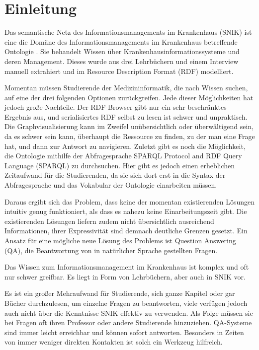 \documentclass[utf8,biblatex]{lni}
\begin{document}
%

\section{Einleitung}

Das semantische Netz des Informationsmanagements im Krankenhaus (SNIK) ist eine
die Domäne des Informationsmanagements im Krankenhaus betreffende Ontologie \cite{domaene}.
Sie behandelt Wissen über Krankenhausinformationssysteme und deren Management.
Dieses wurde aus drei Lehrbüchern \cite{bb,ob,he} und einem Interview \cite{ciosurvey} manuell extrahiert und im Resource Description Format (RDF) modelliert.

Momentan müssen Studierende der Medizininformatik, die nach Wissen suchen, auf eine der drei folgenden Optionen zurückgreifen.
Jede dieser Möglichkeiten hat jedoch große Nachteile.
Der RDF-Browser gibt nur ein sehr beschränktes Ergebnis aus, und serialisiertes RDF selbst zu lesen ist schwer und unpraktisch.
Die Graphvisualisierung kann im Zweifel unübersichtlich oder überwältigend sein, da es schwer sein kann, überhaupt die Ressource zu finden, zu der man eine Frage hat, und dann zur Antwort zu navigieren.
Zuletzt gibt es noch die Möglichkeit, die Ontologie mithilfe der Abfragesprache SPARQL Protocol and RDF Query Language (SPARQL) zu durchsuchen.
Hier gibt es jedoch einen erheblichen Zeitaufwand für die Studierenden, da sie sich dort erst in die Syntax der Abfragesprache und das Vokabular der Ontologie einarbeiten müssen.

Daraus ergibt sich das Problem, dass keine der momentan existierenden Lösungen intuitiv genug funktioniert, als dass es nahezu keine Einarbeitungszeit gibt.
Die existierenden Lösungen liefern zudem nicht übersichtlich ausreichend Informationen, ihrer Expressivität sind demnach deutliche Grenzen gesetzt.
Ein Ansatz für eine mögliche neue Lösung des Problems ist Question Answering (QA), die Beantwortung von in natürlicher Sprache gestellten Fragen.

Das Wissen zum Informationsmanagement im Krankenhaus ist komplex und oft nur schwer greifbar.
Es liegt in Form von Lehrbüchern, aber auch in SNIK vor.

Es ist ein großer Mehraufwand für Studierende, sich ganze Kapitel oder gar Bücher durchzulesen, um einzelne Fragen zu beantworten, viele verfügen jedoch auch nicht über die Kenntnisse SNIK effektiv zu verwenden.
Als Folge müssen sie bei Fragen oft ihren Professor oder andere Studierende hinzuziehen.
QA-Systeme sind immer leicht erreichbar und können sofort antworten.
Besonders in Zeiten von immer weniger direkten Kontakten ist solch ein Werkzeug hilfreich.
\end{document}

